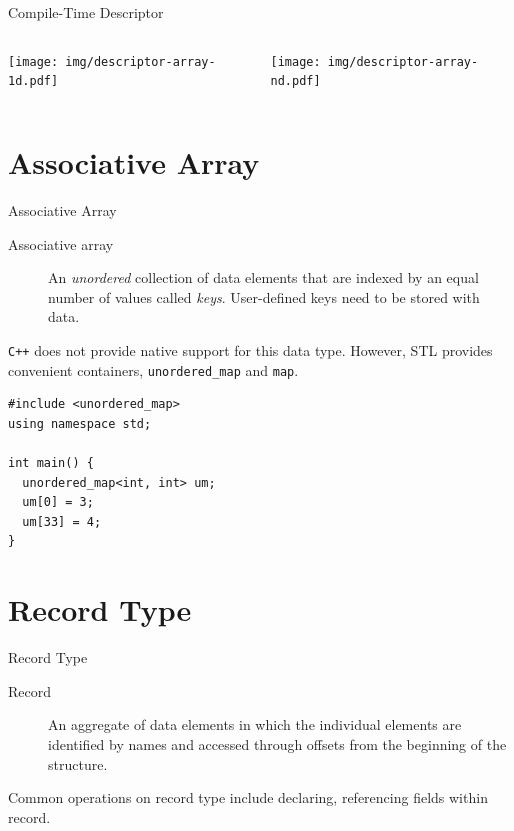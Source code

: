 \documentclass[presentation]{beamer}
\begin{document}
\begin{frame}[label={sec:orgheadline34}]{Compile-Time Descriptor}
\begin{columns}
\begin{column}{0.3\columnwidth}
\texttt{[image: img/descriptor-array-1d.pdf]}
\end{column}

\begin{column}{0.3\columnwidth}
\texttt{[image: img/descriptor-array-nd.pdf]}
\end{column}
\end{columns}
\end{frame}

\section{Associative Array}
\label{sec:orgheadline37}

\begin{frame}[fragile,label={sec:orgheadline36}]{Associative Array}
 \begin{description}
\item[{Associative array}] An \emph{unordered} collection of data elements
that are indexed by an equal number of values called \emph{keys}.
User-defined keys need to be stored with data.
\end{description}


\texttt{C++} does not provide native support for this data type.  However,
STL provides convenient containers, \texttt{unordered\_map} and \texttt{map}.

\begin{verbatim}
#include <unordered_map>
using namespace std;

int main() {
  unordered_map<int, int> um;
  um[0] = 3;
  um[33] = 4;
}
\end{verbatim}
\end{frame}

\section{Record Type}
\label{sec:orgheadline44}

\begin{frame}[label={sec:orgheadline38}]{Record Type}
\begin{description}
\item[{Record}] An aggregate of data elements in which the individual
elements are identified by names and accessed through offsets
from the beginning of the structure.
\end{description}


Common operations on record type include declaring, referencing
fields within record.
\end{frame}
\end{document}
